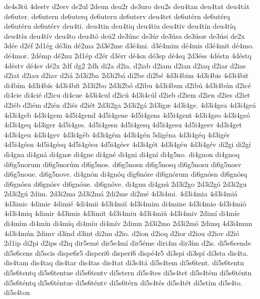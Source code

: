 {de4s3t^^fa
4destv
d2esv
de2ul
2deun
deu2r
de3uro
deu2s
deu4tan
deu4tat
deu4t^^e1t
de6uter.
de6utern
de6uterq
de6uteru
de6uterv
deu4tet
de6ut^^e9rn
de6ut^^e9rq
de6ut^^e9ru
de6ut^^e9rv
deu4ti.
deu4tin
deu4tiq
deu4tiu
deu4tiv
deu4t^^edn
deu4t^^edq
deu4t^^edu
deu4t^^edv
deu4to
deu4t^^f3
de^^fa2
de3^^fanc
de3^^far
de3^^fasa
de3^^fas^^e6
de3^^fasi
de2x
3d^^e9e
d2^^e9f
2d1^^e9g
d^^e93in
d^^e92ma
2d3^^e92me
d3^^e94mi.
d3^^e94mim
d^^e94mis
d3^^e94mit
d^^e94mo.
d^^e94mor.
2d^^e9mp
d^^e92nu
2d1^^e9p
d2^^e9r
d3^^e9rr
d^^e94sn
d^^e93sp
d^^e94sq
2d3^^e9ss
4d^^e9stn
4d^^e9stq
4d^^e9stv
d^^e94sv
d^^e92x
2df
dg2
2dh
di2a
d2ia.
d2iab
d2iam
d2ian
d2iaq
d2iar
d2ias
d2iat
d2iau
d2iav
d2i^^e1
2d3i2ba
2d3i2b^^e1
di2be
di2b^^e9
4d3i4bim
4d3i4bis
4d3i4bit
di4b^^edm
4d3i4b^^eds
4d3i4b^^edt
2d3i2bo
2d3i2b^^f3
d2ibu
4d3i4bun
d2ib^^fa
4d3i4b^^fan
d2ic^^e9
di4cie
di4ci^^e9
d2icu
di4cue
4d3i4cul
d2ic^^fa
4d3i4c^^fal
d2ieb
d2iem
d2ien
d2ies
d2iet
d2i^^e9b
d2i^^e9m
d2i^^e9n
d2i^^e9s
d2i^^e9t
2d3i2ga
2d3i2g^^e1
2d3ig^^e6
4d3i4ge.
4d3i4gea
4d3i4ge^^e1
4d3i4geb
4d3i4gem
4d5i4gend
4d5i4gene
4d5i4gens
4d5i4gent
4d3i4geo
4d3i4ge^^f3
4d3i4geq
4d3iger
4d5i4ges.
4d5i4gesn
4d5i4gesq
4d5i4gesu
4d5i4gesv
4d3i4get
4d3i4geu
4d3i4gev
4d3i4g^^e9b
4d3i4g^^e9m
4d3i4g^^e9n
5dig^^e9na
4d3i4g^^e9q
4d3ig^^e9r
4d5i4g^^e9sn
4d5i4g^^e9sq
4d5i4g^^e9su
4d5i4g^^e9sv
4d3i4g^^e9t
4d3i4g^^e9u
4d3i4g^^e9v
di2gi
di2g^^ed
di4gna
di4gn^^e1
di4gn^^e6
di4gne
di4gn^^e9
di4gni
di4gn^^ed
di4g5no.
di4gnon
di4gnoq
di6g5norum
di6g5nor^^fam
di6g5nos.
di6g5nosn
di6g5nosq
di6g5nosu
di6g5nosv
di6g5noue.
di6g5nove.
di4gn^^f3n
di4gn^^f3q
dig6n^^f3re
di6gn^^f3rum
di6gn^^f3sn
di6gn^^f3sq
di6gn^^f3su
di6gn^^f3sv
di6gn^^f3ue.
di6gn^^f3ve.
di4gnu
di4gn^^fa
2d3i2go
2d3i2g^^f3
2d3i2gu
2d3i2g^^fa
2dim.
2d3i2ma
2d3i2m^^e1
2di2me
di2m^^e9
4d3i4mi.
4d3i4mia
4d3i4mi^^e1
4d3imic
4dimie
4dimi^^e9
4di4mii
4d3i4mi^^ed
4d3i4mim
di4mine
4d3i4mio
4d3i4mi^^f3
4d3i4miq
4dimir
4d3imis
4d3imit
4d3i4miu
4d3i4mi^^fa
4d3i4miv
2dim^^ed
di4m^^ede
di4m^^edm
di4m^^edn
di4m^^edq
di4m^^edu
di4m^^edv
2dimn
2d3i2mo
2d3i2m^^f3
2dimq
4d3i4mun
4d3i4m^^fan
2dimv
d3ind
d3int
di2nu
d2io.
d2ion
d2ioq
d2ior
d2iou
d2iov
d2i^^f3
2d1ip
di2pi
d2ips
d2iq
dir5em^^e9
dir5e4m^^ed
dir5^^e9me
diri4m
dir3^^edm
d2is.
di5s6cende
di5s6cens
di5scis
dispe6r5
disperi6
disper^^ed6
disp^^e94r5
di3spi
di3sp^^ed
di3sta
dis4ta.
dis4tam
dis4taq
dis4tar
dis4tas
dis4tat
di3s4t^^e1
di5s4tem
di5s6tent.
di5s6tentn
di5s6tentq
di5s6tentue
di5s6tentv
di5stern
di5s4tes
di5s4tet
di5s4t^^e9m
di5s6t^^e9ntn
di5s6t^^e9ntq
di5s6t^^e9ntue
di5s6t^^e9ntv
di5s6t^^e9rn
di5s4t^^e9s
di5s4t^^e9t
di5st^^edm
di5s4to.
di5s4ton
}
